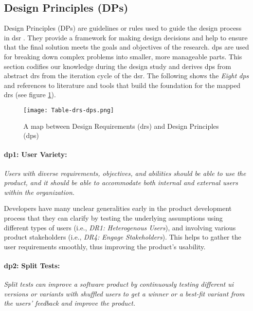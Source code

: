 \subsection{Design Principles (DPs)}
\label{design:section:designprinciple}
Design Principles (DPs) are guidelines or rules used to guide the design process in \ac{dsr} \cite{misc:dsr:henver}. 
They provide a framework for making design decisions \cite{paper:designprinciple:gregor} and help to ensure that the final solution meets the goals and objectives of the research. 
\ac{dp}s are used for breaking down complex problems into smaller, more manageable parts.
This section codifies our knowledge during the design study and derives \ac{dp}s from abstract \ac{dr}s from the iteration cycle of the \ac{dsr}.
The following shows the \textit{Eight \ac{dp}s} and references to literature and tools that build the foundation for the mapped \ac{dr}s (see figure \ref{fig:design:table-drs-dps}). 
\begin{figure}[htbp!]
  \centering    
  \texttt{[image: Table-drs-dps.png]}
  \caption[A map between \ac{dr}s and \ac{dp}s]{A map between Design Requirements (\ac{dr}s) and Design Principles (\ac{dp}s)}
  \label{fig:design:table-drs-dps}
\end{figure}

\paragraph{\ac{dp}1: User Variety:} \textit{Users with diverse requirements, objectives, and abilities should be able to use the product, and it should be able to accommodate both internal and external users within the organization.}

Developers have many unclear generalities early in the product development process \cite{misc:lean:steve} that they can clarify by testing the underlying assumptions using different types of users (i.e., \textit{DR1: Heterogenous Users}), and involving various product stakeholders (i.e., \textit{DR4: Engage Stakeholders}).
This helps to gather the user requirements smoothly, thus improving the product's usability.

\paragraph{\ac{dp}2: Split Tests:} \textit{Split tests can improve a software product by continuously testing different \ac{ui} versions or variants with shuffled users to get a winner or a best-fit variant from the users' feedback and improve the product.}

